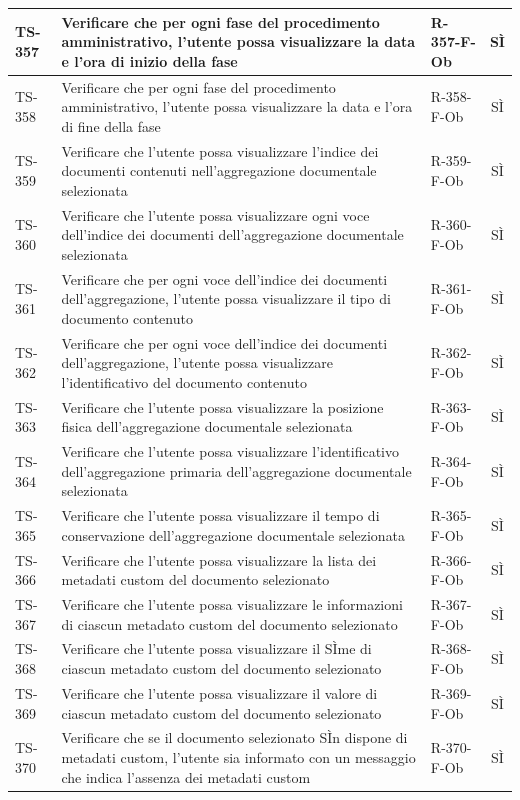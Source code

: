 \documentclass[a4paper,12pt]{article}
\begin{document}
\begin{longtable}{|p{1.5cm}|p{8.3cm}|p{2.4cm}|c|}
TS-357 & Verificare che per ogni fase del procedimento amministrativo, l'utente possa visualizzare la data e l'ora di inizio della fase & R-357-F-Ob & SÌ \\
\hline
TS-358 & Verificare che per ogni fase del procedimento amministrativo, l'utente possa visualizzare la data e l'ora di fine della fase & R-358-F-Ob & SÌ \\
\hline
TS-359 & Verificare che l'utente possa visualizzare l'indice dei documenti contenuti nell'aggregazione documentale selezionata & R-359-F-Ob & SÌ \\
\hline
TS-360 & Verificare che l'utente possa visualizzare ogni voce dell'indice dei documenti dell'aggregazione documentale selezionata & R-360-F-Ob & SÌ \\
\hline
TS-361 & Verificare che per ogni voce dell'indice dei documenti dell'aggregazione, l'utente possa visualizzare il tipo di documento contenuto & R-361-F-Ob & SÌ \\
\hline
TS-362 & Verificare che per ogni voce dell'indice dei documenti dell'aggregazione, l'utente possa visualizzare l'identificativo del documento contenuto & R-362-F-Ob & SÌ \\
\hline
TS-363 & Verificare che l'utente possa visualizzare la posizione fisica dell'aggregazione documentale selezionata & R-363-F-Ob & SÌ \\
\hline
TS-364 & Verificare che l'utente possa visualizzare l'identificativo dell'aggregazione primaria dell'aggregazione documentale selezionata & R-364-F-Ob & SÌ \\
\hline
TS-365 & Verificare che l'utente possa visualizzare il tempo di conservazione dell'aggregazione documentale selezionata & R-365-F-Ob & SÌ \\
\hline
TS-366 & Verificare che l'utente possa visualizzare la lista dei metadati custom del documento selezionato & R-366-F-Ob & SÌ \\
\hline
TS-367 & Verificare che l'utente possa visualizzare le informazioni di ciascun metadato custom del documento selezionato & R-367-F-Ob & SÌ \\
\hline
TS-368 & Verificare che l'utente possa visualizzare il SÌme di ciascun metadato custom del documento selezionato & R-368-F-Ob & SÌ \\
\hline
TS-369 & Verificare che l'utente possa visualizzare il valore di ciascun metadato custom del documento selezionato & R-369-F-Ob & SÌ \\
\hline
TS-370 & Verificare che se il documento selezionato SÌn dispone di metadati custom, l'utente sia informato con un messaggio che indica l'assenza dei metadati custom & R-370-F-Ob & SÌ \\

\end{longtable}
\end{document}
